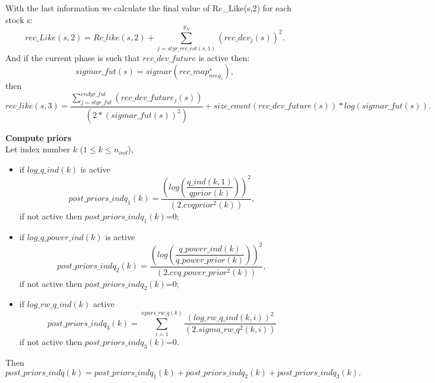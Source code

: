\documentclass{article}
\begin{document}
With the last information we calculate the final value of Rc\_Like(s,2) for each stock s:
\begin{equation}
    rec\_Like(s,2) = Rc\_like(s,2)+ \sum_{j=styr\_rec\_est(s,1)}^{y_N}( rec\_dev_j(s) )^2.
\end{equation}
And if the current phase is such that  $rec\_dev\_future$ is active then: 
\begin{equation}
    sigmar\_fut(s)=sigmar(rec\_map^s_{nreg_s}),
\end{equation}
then
\begin{equation}
    rec\_like(s,3) = \dfrac{ \displaystyle\sum_{j=styr\_fut}^{endyr\_fut}(rec\_dev\_future_j(s))}{(2*(sigmar\_fut(s))^2)} + size\_count(rec\_dev\_future(s))*log(sigmar\_fut(s)).
\end{equation}




\textbf{Compute priors}\\

Let index number $k$ ($1\leq k \leq n_{ind}$),
\begin{itemize}
    \item if $log\_q\_ind(k)$ is active
    \begin{equation}
        post\_priors\_indq_1(k) = \dfrac{\left(log\left(\dfrac{q\_ind(k,1)}{qprior(k)}\right)\right)^2}{(2.cvqprior^2(k))},
    \end{equation}
    if not active then $post\_priors\_indq_1(k)$=0;
    \item if $log\_q\_power\_ind(k)$ is active
    \begin{equation}
        post\_priors\_indq_2(k) = \dfrac{\left(log\left(\dfrac{q\_power\_ind(k)}{q\_power\_prior(k)}\right)\right)^2}{(2.cvq\_power\_prior^2(k))},
    \end{equation}
    if not active then $post\_priors\_indq_2(k)$=0;
    \item if $log\_rw\_q\_ind(k)$ active
    \begin{equation}
        post\_priors\_indq_3(k) = \sum_{i=1}^{npars\_rw\_q(k)}\dfrac{(log\_rw\_q\_ind(k,i))^2}{(2.sigma\_rw\_q^2(k,i))}
    \end{equation}
    if not active then $post\_priors\_indq_3(k)$=0.\\
    
    
    \end{itemize}

    Then 
    \begin{equation}
         post\_priors\_indq(k)=post\_priors\_indq_1(k)+post\_priors\_indq_2(k)+ post\_priors\_indq_3(k).
    \end{equation}
\end{document}
